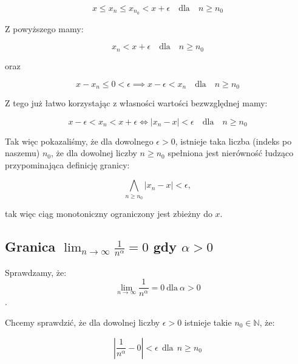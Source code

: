 \documentclass[a4paper,oneside,openright,11pt]{article}
\numberwithin{equation}{section}
\begin{document}
\begin{equation*}
    x \leq x_n \leq x_{n_0}  < x + \epsilon \quad \textrm{dla} \quad n \geq n_0
\end{equation*}

\noindent
Z powyższego mamy:

\begin{equation*}
    x_n < x + \epsilon \quad \textrm{dla} \quad n \geq n_0
\end{equation*}

oraz

\begin{equation*}
    x - x_{n} \leq 0 < \epsilon \implies x - \epsilon  < x_{n}  \quad \textrm{dla} \quad n \geq n_0
\end{equation*}


\vspace{10mm}
\noindent
Z tego już łatwo korzystając z własności wartości bezwzględnej mamy:

\begin{equation*}
    x - \epsilon  < x_{n} < x + \epsilon \iff |x_{n} - x| < \epsilon \quad \textrm{dla} \quad n \geq n_0
\end{equation*}


\noindent
Tak więc pokazaliśmy, że dla dowolnego $\epsilon > 0$, istnieje taka liczba (indeks po naszemu) $n_0$, że dla dowolnej liczby $n \geq n_0$
spełniona jest nierówność łudząco przypominająca definicję granicy:

$$  \bigwedge_{n \geq n_0} |x_{n} - x| < \epsilon ,$$

tak więc ciąg monotoniczny ograniczony jest zbieżny do $x$.

\subsection{Granica $\lim_{n\to\infty} \frac{1}{n^\alpha} = 0$ gdy $\alpha > 0$}

Sprawdzamy, że: $$\lim_{n\to\infty} \frac{1}{n^ \alpha} = 0 \ \textrm{dla} \ \alpha > 0$$.

\vspace{10mm}

Chcemy sprawdzić, że dla dowolnej liczby $\epsilon > 0$ istnieje takie $n_{0} \in \mathbb{N}$, że:


\begin{equation*}
    |\frac{1}{n^\alpha} - 0| < \epsilon \ \ \textrm{dla} \ \ n \geq n_0
\end{equation*}

\vspace{10mm}
\end{document}
